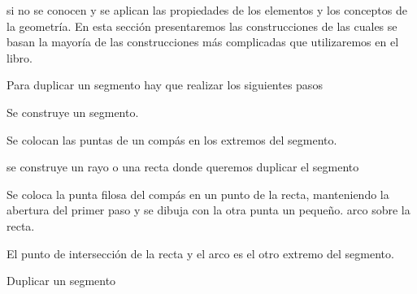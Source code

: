 si no se conocen y se aplican las propiedades de los elementos  y los conceptos
de la geometría.
\vskip 20pt
En esta sección presentaremos las construcciones de las cuales se basan la
mayoría
 de las construcciones más complicadas que utilizaremos en el libro.
\begin{construccion}{Para duplicar un segmento hay que realizar los siguientes pasos
\begin{lista}
 \item Se construye un segmento.
 \item  Se colocan las puntas de un compás en los extremos del segmento.
 \item se construye un rayo o una recta donde queremos duplicar el segmento
 \item Se coloca la punta filosa del compás en un punto de la recta, manteniendo la abertura del primer
  paso y se dibuja  con la otra punta un peque\~no. arco sobre la recta.
  \item El punto de intersección de la recta y el arco es el otro extremo del segmento.
\end{lista}
}{Duplicar un segmento}
\end{construccion}

